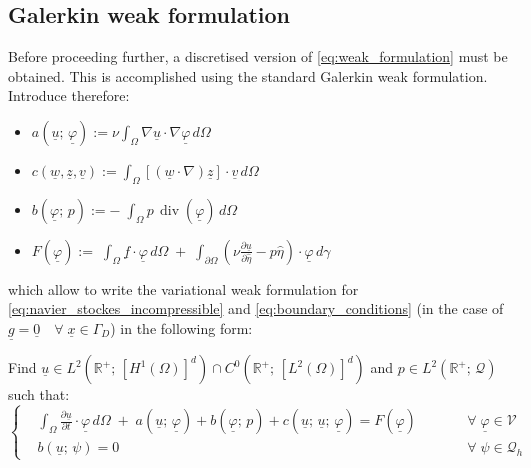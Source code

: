 \documentclass[11pt,a4paper]{article}
\newcommand{\R}{\mathds{R}}
\renewcommand{\vec}[1]{\underline{#1}} %
\let\oldforall\forall
\renewcommand{\forall}{\oldforall \; }
\DeclareMathOperator{\Div}{div}
\begin{document}
\subsection{Galerkin weak formulation}
\label{sec:galerkin_weak_formulation}
Before proceeding further, a discretised version of \eqref{eq:weak_formulation} must be obtained. This is accomplished using the standard Galerkin weak formulation. Introduce therefore: \\
\begin{itemize}
    \item $\displaystyle a\left(\vec{u}; \, \vec{\varphi} \right) := \nu \int_{\Omega} \nabla \vec{u} \cdot \nabla \vec{\varphi}  \, d\Omega$ \\
    \item $\displaystyle c \left( \vec{w}, \vec{z}, \vec{v} \right) := \int_{\Omega} [ (\vec{w} \cdot \nabla) \vec{z}] \cdot \vec{v} \, d\Omega$
    \item $\displaystyle b\left(\vec{\varphi}; \, p \right) := - \; \int_{\Omega} p \, \Div \left( \vec{\varphi} \right) \, d\Omega$ \\
    \item $\displaystyle F\left( \vec{\varphi} \right) := \; \int_{\Omega} \vec{f} \cdot \vec{\varphi} \, d\Omega \; + \; \int_{\partial \Omega} \left( \nu \frac{\partial \vec{u}}{\partial \hat{\eta}} - p \hat{\eta} \right) \cdot \vec{\varphi}  \, d\gamma$
\end{itemize}
which allow to write the variational weak formulation for \eqref{eq:navier_stockes_incompressible} and \eqref{eq:boundary_conditions} (in the case of  $\vec{g} = \vec{0} \quad \forall \vec{x} \in \Gamma_{D}$) in the following form: 
\begin{tcolorbox}[colback = black!3, colframe=black!40]
    Find $\vec{u} \in L^{2}\left(\R^{+}; \, \left[H^{1}(\Omega) \right]^{d} \right) \cap C^{0}\left(\R^{+}; \, \left[L^{2}(\Omega) \right]^{d} \right)$ and $p \in L^{2}\left( \R^{+}; \, \mathcal{Q} \right)$ such that: 
    \begin{equation}
        \label{eq:weak_variational_formulation}
        \left\{ \begin{aligned}
                            &\int_{\Omega} \frac{\partial \vec{u}}{\partial t} \cdot \vec{\varphi} \,  d\Omega \; + \; a\left(\vec{u}; \, \vec{\varphi} \right) +  b\left(\vec{\varphi}; \, p \right) + c \left(\vec{u}; \,  \vec{u}; \,  \vec{\varphi} \right) = F\left( \vec{\varphi} \right) \qquad &&\forall \vec{\varphi} \in \mathcal{V} \\
                            &b \left(\vec{u}; \, \psi \right) = 0  &&\forall \psi \in \mathcal{Q}_{h}
                \end{aligned} \right.
    \end{equation}
\end{tcolorbox}
\end{document}
